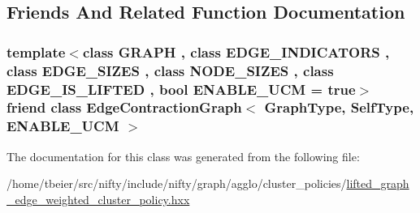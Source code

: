 \subsection{Friends And Related Function Documentation}
\hypertarget{classnifty_1_1graph_1_1agglo_1_1LiftedGraphEdgeWeightedClusterPolicy_a6939aa4c6113ba9c44fd5e048687ba92}{}
\subsubsection[{Edge\+Contraction\+Graph$<$ Graph\+Type, Self\+Type, E\+N\+A\+B\+L\+E\+\_\+\+U\+C\+M $>$}]{\setlength{\rightskip}{0pt plus 5cm}template$<$class G\+R\+A\+P\+H , class E\+D\+G\+E\+\_\+\+I\+N\+D\+I\+C\+A\+T\+O\+R\+S , class E\+D\+G\+E\+\_\+\+S\+I\+Z\+E\+S , class N\+O\+D\+E\+\_\+\+S\+I\+Z\+E\+S , class E\+D\+G\+E\+\_\+\+I\+S\+\_\+\+L\+I\+F\+T\+E\+D , bool E\+N\+A\+B\+L\+E\+\_\+\+U\+C\+M = true$>$ friend class {\bf Edge\+Contraction\+Graph}$<$ {\bf Graph\+Type}, {\bf Self\+Type}, E\+N\+A\+B\+L\+E\+\_\+\+U\+C\+M $>$\hspace{0.3cm}{\ttfamily [friend]}}\label{classnifty_1_1graph_1_1agglo_1_1LiftedGraphEdgeWeightedClusterPolicy_a6939aa4c6113ba9c44fd5e048687ba92}


The documentation for this class was generated from the following file\+:\begin{DoxyCompactItemize}
\item 
/home/tbeier/src/nifty/include/nifty/graph/agglo/cluster\+\_\+policies/\hyperlink{lifted__graph__edge__weighted__cluster__policy_8hxx}{lifted\+\_\+graph\+\_\+edge\+\_\+weighted\+\_\+cluster\+\_\+policy.\+hxx}\end{DoxyCompactItemize}
